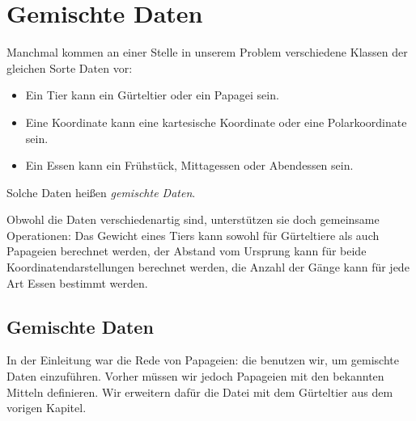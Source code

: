 
\chapter{Gemischte Daten}
\label{cha:gemischte-daten}

Manchmal kommen an einer Stelle in unserem Problem verschiedene
Klassen der gleichen Sorte Daten vor:
%
\begin{itemize}
\item Ein Tier kann ein Gürteltier oder ein Papagei sein.
\item Eine Koordinate kann eine kartesische Koordinate oder eine
  Polarkoordinate sein.
\item Ein Essen kann ein Frühstück, Mittagessen oder Abendessen sein.
\end{itemize}
%
Solche Daten heißen \textit{gemischte Daten}.

Obwohl die Daten verschiedenartig sind, unterstützen sie doch
gemeinsame Operationen: Das Gewicht eines Tiers kann sowohl für
Gürteltiere als auch Papageien berechnet werden, der Abstand vom
Ursprung kann für beide Koordinatendarstellungen berechnet werden, die
Anzahl der Gänge kann für jede Art Essen bestimmt werden.

\section{Gemischte Daten}
\label{sec:mixed-data}

In der Einleitung war die Rede von Papageien: die benutzen wir, um
gemischte Daten einzuführen.  Vorher müssen wir jedoch Papageien mit den bekannten
Mitteln definieren.  Wir erweitern dafür die Datei mit dem Gürteltier
aus dem vorigen Kapitel.

